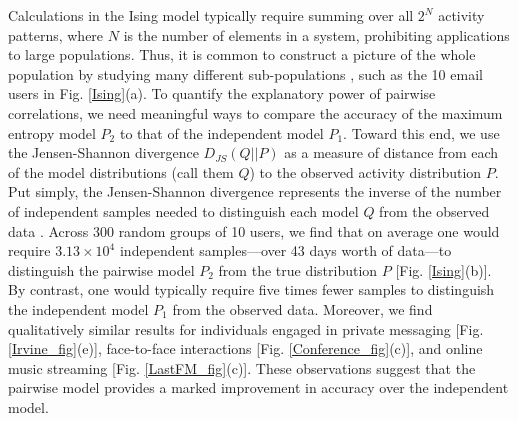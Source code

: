 \documentclass[aps,reprint,superscriptaddress,amsmath,amssymb,longbibliography]{revtex4-1}
\begin{document}
Calculations in the Ising model typically require summing over all $2^N$ activity patterns, where $N$ is the number of elements in a system, prohibiting applications to large populations. Thus, it is common to construct a picture of the whole population by studying many different sub-populations \cite{Schneidman-01}, such as the 10 email users in Fig. \ref{Ising}(a). To quantify the explanatory power of pairwise correlations, we need meaningful ways to compare the accuracy of the maximum entropy model $P_2$ to that of the independent model $P_1$. Toward this end, we use the Jensen-Shannon divergence $D_{JS}(Q||P)$ as a measure of distance from each of the model distributions (call them $Q$) to the observed activity distribution $P$. Put simply, the Jensen-Shannon divergence represents the inverse of the number of independent samples needed to distinguish each model $Q$ from the observed data \cite{Lin-01}. Across 300 random groups of 10 users, we find that on average one would require $3.13\times 10^4$ independent samples---over 43 days worth of data---to distinguish the pairwise model $P_2$ from the true distribution $P$ [Fig. \ref{Ising}(b)]. By contrast, one would typically require five times fewer samples to distinguish the independent model $P_1$ from the observed data. Moreover, we find qualitatively similar results for individuals engaged in private messaging [Fig. \ref{Irvine_fig}(e)], face-to-face interactions [Fig. \ref{Conference_fig}(c)], and online music streaming [Fig. \ref{LastFM_fig}(c)]. These observations suggest that the pairwise model provides a marked improvement in accuracy over the independent model.
\end{document}
